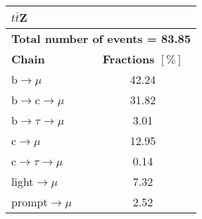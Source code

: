 \begin{tabular}{|l|c|}          
	\hline          
	\multicolumn{2}{|l|}{\textbf{$t\bar t$Z}}    \\        
	\hline          
	\multicolumn{2}{|l|}{\textbf{Total number of events = 83.85}}    \\
	\hline
	\textbf{Chain}        									 & \textbf{Fractions $[\%]$} \\                          
	\hline          
	b$\rightarrow \mu$                 					&   42.24  \\          
	b$\rightarrow$c$\rightarrow \mu$     	&    31.82    \\          
	b$\rightarrow \tau \rightarrow \mu$  	&    3.01 \\          
	c$\rightarrow \mu$                 				 &    12.95\\          
	c$\rightarrow \tau \rightarrow \mu$  	&     0.14\\          
	light$\rightarrow \mu$              			&    7.32 \\          
	prompt$\rightarrow \mu$                	 	&   2.52\\            
	\hline    
\end{tabular}    
